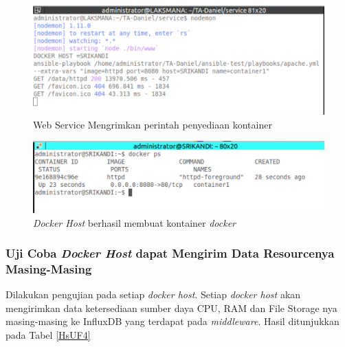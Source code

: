 \begin{figure}[H]
\centering
\includegraphics[width=\linewidth]{images/bab5/Selection_006}
\caption{Web Service Mengrimkan perintah penyediaan kontainer}
\label{perintahansible}
\end{figure}     

\begin{figure}[H]
\centering
\includegraphics[width=\linewidth]{images/bab5/Selection_007}
\caption{\emph{Docker Host} berhasil membuat kontainer \emph{docker}}
\label{dockerterpasang}
\end{figure}     

\subsubsection{Uji Coba \textit{Docker Host} dapat Mengirim Data Resourcenya Masing-Masing}
      Dilakukan pengujian pada setiap \textit{docker host}. Setiap \textit{docker host} akan mengirimkan data ketersediaan sumber daya CPU, RAM dan File Storage nya masing-masing ke InfluxDB yang terdapat pada \textit{middleware}. Hasil ditunjukkan pada Tabel \ref{HsUF4} 
      
